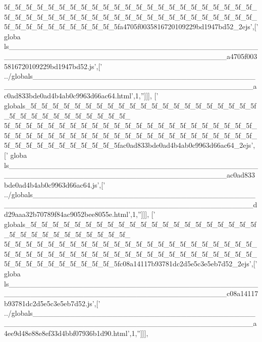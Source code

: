 \begin{DoxyCode}
{      5f\_5f\_5f\_5f\_5f\_5f\_5f\_5f\_5f\_5f\_5f\_5f\_5f\_5f\_5f\_5f\_5f\_5f\_5f\_5f\_5f\_5f\_5f\_5f\_5f\_5f\_5f\_5f\_5f\_5f\_5f\_5f\_5f\_5f\_5f\_5f\_5f\_5f\_5f\_5f\_5f\_5f\_5f\_5f\_5f\_5f\_5f\_5f\_5f\_5f\_5f\_5f\_5f\_5f\_5f\_5f\_5fa4705f0035816720109229bd1947bd52\_2ejs'},[\textcolor{stringliteral}{'
      globa
      ls\_\_\_\_\_\_\_\_\_\_\_\_\_\_\_\_\_\_\_\_\_\_\_\_\_\_\_\_\_\_\_\_\_\_\_\_\_\_\_\_\_\_\_\_\_\_\_\_\_\_\_\_\_\_\_\_\_\_\_\_\_\_\_\_\_\_\_\_\_\_\_\_\_\_\_\_\_\_\_\_\_\_\_\_\_\_\_\_\_a4705f0035816720109229bd1947bd52.js'},[\textcolor{stringliteral}{'
      ../globals\_\_\_\_\_\_\_\_\_\_\_\_\_\_\_\_\_\_\_\_\_\_\_\_\_\_\_\_\_\_\_\_\_\_\_\_\_\_\_\_\_\_\_\_\_\_\_\_\_\_\_\_\_\_\_\_\_\_\_\_\_\_\_\_\_\_\_\_\_\_\_\_\_\_\_\_\_\_\_\_\_\_\_\_\_\_\_\_\_ac0ad833bde0ad4b4ab0c9963d66ac64.html'},1,\textcolor{stringliteral}{''}]]],
  [\textcolor{stringliteral}{'
      globals\_5f\_5f\_5f\_5f\_5f\_5f\_5f\_5f\_5f\_5f\_5f\_5f\_5f\_5f\_5f\_5f\_5f\_5f\_5f\_5f\_5f\_5f\_5f\_5f\_5f\_5f\_5f\_5f\_5f\_5f\_5f\_5f\_
      5f\_5f\_5f\_5f\_5f\_5f\_5f\_5f\_5f\_5f\_5f\_5f\_5f\_5f\_5f\_5f\_5f\_5f\_5f\_5f\_5f\_5f\_5f\_5f\_5f\_5f\_5f\_5f\_5f\_5f\_5f\_5f\_5f\_5f\_5f\_5f\_5f\_5f\_5f\_5f\_5f\_5f\_5f\_5f\_5f\_5f\_5f\_5f\_5f\_5f\_5f\_5f\_5f\_5f\_5f\_5f\_5fac0ad833bde0ad4b4ab0c9963d66ac64\_2ejs'},[\textcolor{stringliteral}{'
      globa
      ls\_\_\_\_\_\_\_\_\_\_\_\_\_\_\_\_\_\_\_\_\_\_\_\_\_\_\_\_\_\_\_\_\_\_\_\_\_\_\_\_\_\_\_\_\_\_\_\_\_\_\_\_\_\_\_\_\_\_\_\_\_\_\_\_\_\_\_\_\_\_\_\_\_\_\_\_\_\_\_\_\_\_\_\_\_\_\_\_\_ac0ad833bde0ad4b4ab0c9963d66ac64.js'},[\textcolor{stringliteral}{'
      ../globals\_\_\_\_\_\_\_\_\_\_\_\_\_\_\_\_\_\_\_\_\_\_\_\_\_\_\_\_\_\_\_\_\_\_\_\_\_\_\_\_\_\_\_\_\_\_\_\_\_\_\_\_\_\_\_\_\_\_\_\_\_\_\_\_\_\_\_\_\_\_\_\_\_\_\_\_\_\_\_\_\_\_\_\_\_\_\_\_\_dd29aaa32b70789f84ac9052bee8055e.html'},1,\textcolor{stringliteral}{''}]]],
  [\textcolor{stringliteral}{'
      globals\_5f\_5f\_5f\_5f\_5f\_5f\_5f\_5f\_5f\_5f\_5f\_5f\_5f\_5f\_5f\_5f\_5f\_5f\_5f\_5f\_5f\_5f\_5f\_5f\_5f\_5f\_5f\_5f\_5f\_5f\_5f\_5f\_
      5f\_5f\_5f\_5f\_5f\_5f\_5f\_5f\_5f\_5f\_5f\_5f\_5f\_5f\_5f\_5f\_5f\_5f\_5f\_5f\_5f\_5f\_5f\_5f\_5f\_5f\_5f\_5f\_5f\_5f\_5f\_5f\_5f\_5f\_5f\_5f\_5f\_5f\_5f\_5f\_5f\_5f\_5f\_5f\_5f\_5f\_5f\_5f\_5f\_5f\_5f\_5f\_5f\_5f\_5f\_5f\_5fc08a14117b93781dc2d5e5c3e5eb7d52\_2ejs'},[\textcolor{stringliteral}{'
      globa
      ls\_\_\_\_\_\_\_\_\_\_\_\_\_\_\_\_\_\_\_\_\_\_\_\_\_\_\_\_\_\_\_\_\_\_\_\_\_\_\_\_\_\_\_\_\_\_\_\_\_\_\_\_\_\_\_\_\_\_\_\_\_\_\_\_\_\_\_\_\_\_\_\_\_\_\_\_\_\_\_\_\_\_\_\_\_\_\_\_\_c08a14117b93781dc2d5e5c3e5eb7d52.js'},[\textcolor{stringliteral}{'
      ../globals\_\_\_\_\_\_\_\_\_\_\_\_\_\_\_\_\_\_\_\_\_\_\_\_\_\_\_\_\_\_\_\_\_\_\_\_\_\_\_\_\_\_\_\_\_\_\_\_\_\_\_\_\_\_\_\_\_\_\_\_\_\_\_\_\_\_\_\_\_\_\_\_\_\_\_\_\_\_\_\_\_\_\_\_\_\_\_\_\_a4ee9d48e88e8ef33d4bbf07936b1d90.html'},1,\textcolor{stringliteral}{''}]]],

\end{DoxyCode}

